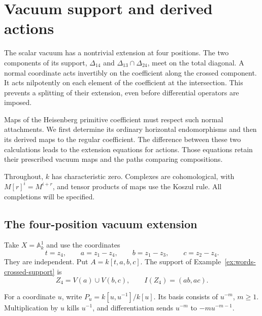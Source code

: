 \chapter{Vacuum support and derived actions}
\label{cbc:chap:vacuum-actions}

The scalar vacuum has a nontrivial extension at four positions.
The two components of its support,
$\Delta_{14}$ and $\Delta_{13}\cap\Delta_{24}$,
meet on the total diagonal. A normal coordinate acts
invertibly on the coefficient along the crossed component.
It acts nilpotently on each element of the coefficient at
the intersection. This prevents a splitting of their
extension, even before differential operators are imposed.

Maps of the Heisenberg primitive coefficient must respect
such normal attachments. We first determine its ordinary
horizontal endomorphisms and then its derived maps to the
regular coefficient. The difference between these two
calculations leads to the extension equations for actions.
Those equations retain their prescribed vacuum maps and
the paths comparing compositions.

Throughout, $k$ has characteristic zero. Complexes are
cohomological, with $M[r]^i=M^{i+r}$, and tensor products of
maps use the Koszul rule. All completions will be specified.

\section{The four-position vacuum extension}
\label{cbc:va:four}

Take $X=\mathbb A^1_k$ and use the coordinates
\[
 t=z_4,\qquad a=z_1-z_4,\qquad
 b=z_1-z_3,\qquad c=z_2-z_4.
\]
They are independent. Put $A=k[t,a,b,c]$.
The support of Example~\ref{ex:words-crossed-support} is
\[
 Z_4=V(a)\cup V(b,c),\qquad I(Z_4)=(ab,ac).
\]

For a coordinate $u$, write
$P_u=k[u,u^{-1}]/k[u]$. Its basis consists of $u^{-m}$,
$m\geq1$. Multiplication by $u$ kills $u^{-1}$, and
differentiation sends $u^{-m}$ to $-m u^{-m-1}$.

